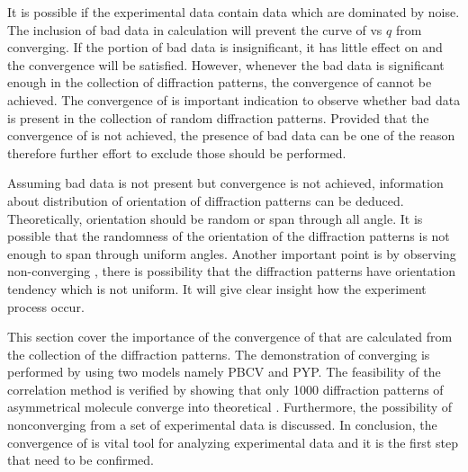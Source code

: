 It is possible if the experimental data contain data which are dominated by noise. The inclusion of bad data in \Blq calculation will prevent the curve of \Blq vs $q$ from converging. If the portion of bad data is insignificant, it has little effect on \Blq and the convergence will be satisfied. However, whenever the bad data is significant enough in the collection of diffraction patterns, the convergence of \Blq cannot be achieved. The convergence of \Blq is important indication to observe whether bad data is present in the collection of random diffraction patterns. Provided that the convergence of \Blq is not achieved, the presence of bad data can be one of the reason therefore further effort to exclude those should be performed.

Assuming bad data is not present but convergence is not achieved, information about distribution of orientation of diffraction patterns can be deduced. Theoretically, orientation should be random or span through all angle. 
It is possible that the randomness of the orientation of the diffraction patterns is not enough to span through uniform angles. Another important point is by observing non-converging \Blq, there is possibility that the diffraction patterns have orientation tendency which is not uniform. It will give clear insight how the experiment process occur. 

This section cover the importance of the convergence of \Blq that are calculated from the collection of the diffraction patterns. The demonstration of converging \Blq is performed by using two models namely PBCV and PYP. The feasibility of the correlation method is verified by showing that only 1000 diffraction patterns of asymmetrical molecule converge into theoretical \Blq. Furthermore, the possibility of nonconverging \Blq from a set of experimental data is discussed. In conclusion, the convergence of \Blq is vital tool for analyzing experimental data and it is the first step that need to be confirmed. 


